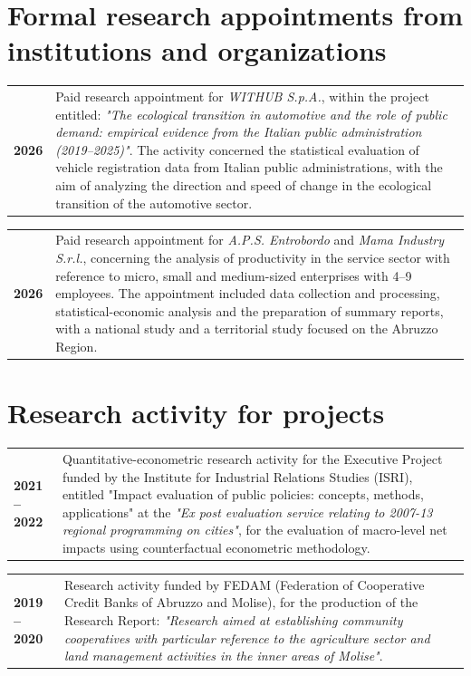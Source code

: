 \documentclass[11pt,a4paper,sans]{moderncv} %
\newcommand{\cvitemcols}[3]{%
  \begin{tabular}{p{#1}p{\dimexpr\linewidth-#1\relax}}
    \textbf{#2} & #3
  \end{tabular}\par\vspace{6pt}
}
\begin{document}
\section{\textbf{Formal research appointments from institutions and organizations}}

\cvitemcols{2cm}{2026}{Paid research appointment for \textit{WITHUB S.p.A.}, within the project entitled: \textit{"The ecological transition in automotive and the role of public demand: empirical evidence from the Italian public administration (2019--2025)"}. The activity concerned the statistical evaluation of vehicle registration data from Italian public administrations, with the aim of analyzing the direction and speed of change in the ecological transition of the automotive sector.}


\cvitemcols{2cm}{2026}{Paid research appointment for \textit{A.P.S. Entrobordo} and \textit{Mama Industry S.r.l.}, concerning the analysis of productivity in the service sector with reference to micro, small and medium-sized enterprises with 4--9 employees. The appointment included data collection and processing, statistical-economic analysis and the preparation of summary reports, with a national study and a territorial study focused on the Abruzzo Region.}





\section{\textbf{Research activity for projects}}

\cvitemcols{2cm}{2021 \newline  -- 2022}{Quantitative-econometric research activity for the Executive Project funded by the Institute for Industrial Relations Studies (ISRI), entitled "Impact evaluation of public policies: concepts, methods, applications" at the \textit{"Ex post evaluation service relating to 2007-13 regional programming on cities"}, for the evaluation of macro-level net impacts using counterfactual econometric methodology.}

\cvitemcols{2cm}{2019 \newline --  2020}{Research activity funded by FEDAM (Federation of Cooperative Credit Banks of Abruzzo and Molise), for the production of the Research Report: \textit{"Research aimed at establishing community cooperatives with particular reference to the agriculture sector and land management activities in the inner areas of Molise"}.}
\end{document}
